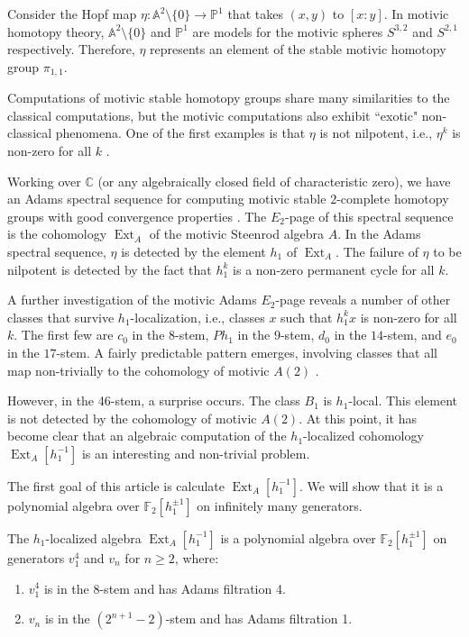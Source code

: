 \documentclass[10pt]{amsart}
\begin{document}
Consider the Hopf map $\eta:{\ensuremath{\mathbb{A}}}^2\setminus\{0\} {\longrightarrow} {\ensuremath{\mathbb{P}}}^1$
that takes $(x,y)$ to $[x:y]$.
In motivic homotopy theory, ${\ensuremath{\mathbb{A}}}^2\setminus\{0\}$ and ${\ensuremath{\mathbb{P}}}^1$
are models for the motivic spheres $S^{3,2}$ and $S^{2,1}$ respectively.
Therefore, $\eta$ represents an element of the stable motivic
homotopy group $\pi_{1,1}$.

Computations of motivic stable homotopy groups share many similarities to the
classical computations, but the motivic computations also exhibit
``exotic" non-classical phenomena.  One of the first examples is that
$\eta$ is not nilpotent, i.e., $\eta^k$ is non-zero for all $k$
\cite{Morel}.

Working over ${\ensuremath{\mathbb{C}}}$ (or any algebraically closed field of characteristic zero),
we have an Adams spectral sequence for computing motivic stable
$2$-complete homotopy groups with good convergence properties
\cite{Morel2} \cite{DI} \cite{HKO}.
The $E_2$-page of this spectral sequence is the cohomology
$\operatorname{Ext}_A$ of the motivic Steenrod algebra $A$.
In the Adams spectral sequence, $\eta$ is detected by the element
$h_1$ of $\operatorname{Ext}_A$.
The failure of $\eta$ to be
nilpotent is detected by the fact that $h_1^k$ is a non-zero permanent cycle
for all $k$.

A further investigation of the motivic Adams $E_2$-page reveals a number of
other classes that survive $h_1$-localization, i.e., classes $x$ such that $h_1^k x$
is non-zero for all $k$.  The first few are $c_0$ in the $8$-stem,
$P h_1$ in the $9$-stem, $d_0$ in the $14$-stem, and $e_0$ in the $17$-stem.
A fairly predictable pattern emerges, involving classes that all map
non-trivially to the cohomology of motivic $A(2)$ \cite{IMotA(2)}.

However, in the 46-stem, a surprise occurs.  The class $B_1$ is $h_1$-local.
This element is not detected by the cohomology of motivic $A(2)$.
At this point, it has become clear that an algebraic computation of 
the $h_1$-localized cohomology $\operatorname{Ext}_A[h_1^{-1}]$ 
is an interesting and non-trivial problem.

The first goal of this article is calculate $\operatorname{Ext}_A[h_1^{-1}]$.
We will show that it is a polynomial algebra over
${\ensuremath{\mathbb{F}}}_2 [h_1^{\pm 1}]$ on infinitely many generators.

\begin{thm}\label{thmA} The $h_1$-localized algebra $\operatorname{Ext}_A[h_1^{-1}]$ is a polynomial algebra over ${\ensuremath{\mathbb{F}}}_2[h_1^{\pm 1}]$ on generators $v_1^4$ and $v_n$ for $n\geq 2$,
where:
\begin{enumerate}
\item
$v_1^4$ is in the 8-stem and has Adams filtration 4.
\item
$v_n$ is in the $(2^{n+1} - 2)$-stem and has Adams filtration 1.
\end{enumerate}
\end{thm}
\end{document}
